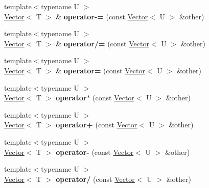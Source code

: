 \begin{DoxyCompactItemize}
\mbox{\label{structmonsterbattle_1_1Vector_aa8d9f6d39b3d54c704fbeecb639f700e}} 
{\footnotesize template$<$typename U $>$ }\\\hyperlink{structmonsterbattle_1_1Vector}{Vector}$<$ T $>$ \& {\bfseries operator-\/=} (const \hyperlink{structmonsterbattle_1_1Vector}{Vector}$<$ U $>$ \&other)
\item 
\mbox{\label{structmonsterbattle_1_1Vector_ab81376969fbf0b3a5ee2ba4cf19640c2}} 
{\footnotesize template$<$typename U $>$ }\\\hyperlink{structmonsterbattle_1_1Vector}{Vector}$<$ T $>$ \& {\bfseries operator/=} (const \hyperlink{structmonsterbattle_1_1Vector}{Vector}$<$ U $>$ \&other)
\item 
\mbox{\label{structmonsterbattle_1_1Vector_a9d07e257e04a91f8548f7cc9e80955e4}} 
{\footnotesize template$<$typename U $>$ }\\\hyperlink{structmonsterbattle_1_1Vector}{Vector}$<$ T $>$ \& {\bfseries operator=} (const \hyperlink{structmonsterbattle_1_1Vector}{Vector}$<$ U $>$ \&other)
\item 
\mbox{\label{structmonsterbattle_1_1Vector_a55a3752eef3424ea394d096745000ab1}} 
{\footnotesize template$<$typename U $>$ }\\\hyperlink{structmonsterbattle_1_1Vector}{Vector}$<$ T $>$ {\bfseries operator$\ast$} (const \hyperlink{structmonsterbattle_1_1Vector}{Vector}$<$ U $>$ \&other)
\item 
\mbox{\label{structmonsterbattle_1_1Vector_a57f2ae3bad04343cf44105692fff281f}} 
{\footnotesize template$<$typename U $>$ }\\\hyperlink{structmonsterbattle_1_1Vector}{Vector}$<$ T $>$ {\bfseries operator+} (const \hyperlink{structmonsterbattle_1_1Vector}{Vector}$<$ U $>$ \&other)
\item 
\mbox{\label{structmonsterbattle_1_1Vector_ac7eed694aeb4c4723278fc11972fb691}} 
{\footnotesize template$<$typename U $>$ }\\\hyperlink{structmonsterbattle_1_1Vector}{Vector}$<$ T $>$ {\bfseries operator-\/} (const \hyperlink{structmonsterbattle_1_1Vector}{Vector}$<$ U $>$ \&other)
\item 
\mbox{\label{structmonsterbattle_1_1Vector_a8e018c8a5546741a063d6866420658eb}} 
{\footnotesize template$<$typename U $>$ }\\\hyperlink{structmonsterbattle_1_1Vector}{Vector}$<$ T $>$ {\bfseries operator/} (const \hyperlink{structmonsterbattle_1_1Vector}{Vector}$<$ U $>$ \&other)
\end{DoxyCompactItemize}
